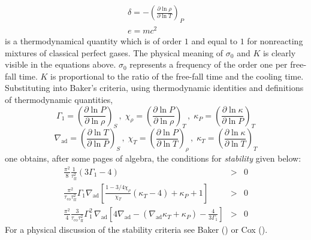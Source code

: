 \documentclass{aa}
\begin{document}
   \begin{equation}
   \begin{array}{l}
      \delta = - \left(
                    \frac{ \partial \ln \rho }{ \partial \ln T }
                 \right)_P \\
      e=mc^2
   \end{array}
   \end{equation}
   is a thermodynamical quantity which is of order $1$ and equal to $1$
   for nonreacting mixtures of classical perfect gases. The physical
   meaning of $ \sigma_0 $ and $K$ is clearly visible in the equations
   above. $\sigma_0$ represents a frequency of the order one per
   free-fall time. $K$ is proportional to the ratio of the free-fall
   time and the cooling time. Substituting into Baker's criteria, using
   thermodynamic identities and definitions of thermodynamic quantities,
   \begin{displaymath}
      \Gamma_1      = \left( \frac{ \partial \ln P}{ \partial\ln \rho}
                           \right)_{S}    \, , \;
      \chi^{}_\rho  = \left( \frac{ \partial \ln P}{ \partial\ln \rho}
                           \right)_{T}    \, , \;
      \kappa^{}_{P} = \left( \frac{ \partial \ln \kappa}{ \partial\ln P}
                           \right)_{T}
   \end{displaymath}
   \begin{displaymath}
      \nabla_{\mathrm{ad}} = \left( \frac{ \partial \ln T}
                             { \partial\ln P} \right)_{S} \, , \;
      \chi^{}_T       = \left( \frac{ \partial \ln P}
                             { \partial\ln T} \right)_{\rho} \, , \;
      \kappa^{}_{T}   = \left( \frac{ \partial \ln \kappa}
                             { \partial\ln T} \right)_{T}
   \end{displaymath}
   one obtains, after some pages of algebra, the conditions for
   \emph{stability\/} given
   below:
   \begin{eqnarray}
      \frac{\pi^2}{8} \frac{1}{\tau_{\mathrm{ff}}^2}
                ( 3 \Gamma_1 - 4 )
         & > & 0 \label{ZSDynSta} \\
      \frac{\pi^2}{\tau_{\mathrm{co}}
                   \tau_{\mathrm{ff}}^2}
                   \Gamma_1 \nabla_{\mathrm{ad}}
                   \left[ \frac{ 1- 3/4 \chi^{}_\rho }{ \chi^{}_T }
                          ( \kappa^{}_T - 4 )
                        + \kappa^{}_P + 1
                   \right]
        & > & 0 \label{ZSSecSta} \\
     \frac{\pi^2}{4} \frac{3}{\tau_{ \mathrm{co} }
                              \tau_{ \mathrm{ff} }^2
                             }
         \Gamma_1^2 \, \nabla_{\mathrm{ad}} \left[
                                   4 \nabla_{\mathrm{ad}}
                                   - ( \nabla_{\mathrm{ad}} \kappa^{}_T
                                     + \kappa^{}_P
                                     )
                                   - \frac{4}{3 \Gamma_1}
                                \right]
        & > & 0   \label{ZSVibSta}
   \end{eqnarray}
%
   For a physical discussion of the stability criteria see Baker
   (\cite{baker}) or Cox (\cite{cox}).
\end{document}
